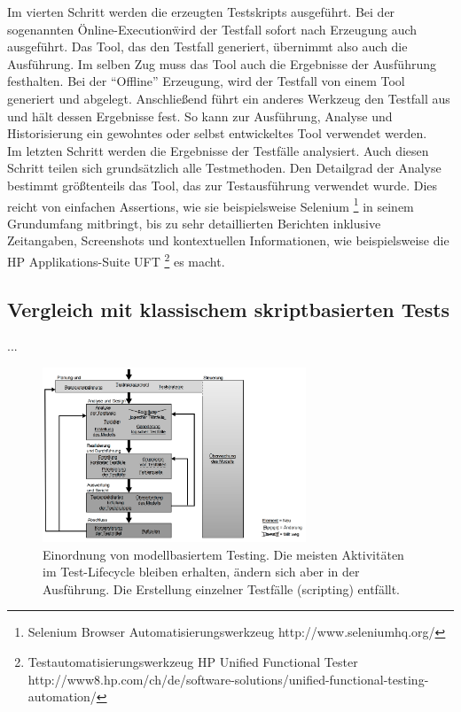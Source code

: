 Im vierten Schritt werden die erzeugten Testskripts ausgeführt. Bei der sogenannten \"Online-Execution\" wird der Testfall sofort nach Erzeugung auch ausgeführt. Das Tool, das den Testfall generiert, übernimmt also auch die Ausführung. Im selben Zug muss das Tool auch die Ergebnisse der Ausführung festhalten. Bei der ``Offline'' Erzeugung, wird der Testfall von einem Tool generiert und abgelegt. Anschließend führt ein anderes Werkzeug den Testfall aus und hält dessen Ergebnisse fest. So kann zur Ausführung, Analyse und Historisierung ein gewohntes oder selbst entwickeltes Tool verwendet werden.\\
Im letzten Schritt werden die Ergebnisse der Testfälle analysiert. Auch diesen Schritt teilen sich grundsätzlich alle Testmethoden. Den Detailgrad der Analyse bestimmt größtenteils das Tool, das zur Testausführung verwendet wurde. Dies reicht von einfachen Assertions, wie sie beispielsweise Selenium \footnote{Selenium Browser Automatisierungswerkzeug http://www.seleniumhq.org/} in seinem Grundumfang mitbringt, bis zu sehr detaillierten Berichten inklusive Zeitangaben, Screenshots und kontextuellen Informationen, wie beispielsweise die HP Applikations-Suite UFT \footnote{Testautomatisierungswerkzeug HP Unified Functional Tester http://www8.hp.com/ch/de/software-solutions/unified-functional-testing-automation/} es macht.

\subsection{Vergleich mit klassischem skriptbasierten Tests}
...

\begin{figure}[h] 
  \centering
     \includegraphics[width=0.7\textwidth]{figures/mbt_vergleich_skript.png}
  \caption{Einordnung von modellbasiertem Testing. Die meisten Aktivitäten im Test-Lifecycle bleiben erhalten, ändern sich aber in der Ausführung. Die Erstellung einzelner Testfälle (scripting) entfällt.}
  \label{fig:fsm_example}
\end{figure}

